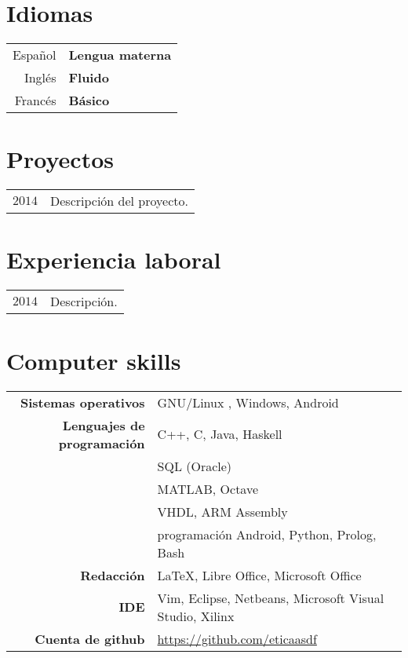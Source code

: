 \documentclass[11pt]{article}
\theoremstyle{plain}
\theoremstyle{definition}
\begin{document}
\section*{\color{mygreen}Idiomas}

\begin{tabular}{r l}
Español & \textbf{Lengua materna} \\
Inglés & \textbf{Fluido} \\
Francés & \textbf{Básico}

\end{tabular}

\section*{Proyectos}
\begin{tabular}{r p{14cm}}
$2014$ & Descripción del proyecto.
\\
\end{tabular}

\section*{Experiencia laboral}
\begin{tabular}{r p{14cm}}
$2014$ & Descripción.
\\
\end{tabular}

\section*{\color{mygreen}Computer skills}

\begin{tabular}{r l}
\textbf{Sistemas operativos} & GNU/Linux , Windows, Android \\

\textbf{Lenguajes de programación} 	& C++, C, Java, Haskell\\
								& SQL (Oracle)\\
								& MATLAB, Octave\\
								& VHDL, ARM Assembly\\
								& programación Android, Python, Prolog, Bash \\

\textbf{Redacción}			& LaTeX, Libre Office, Microsoft Office\\

\textbf{IDE}					& Vim, Eclipse, Netbeans, Microsoft Visual Studio, Xilinx \\


\textbf{Cuenta de github}				& \url{https://github.com/eticaasdf}\\
\end{tabular}
\end{document}
